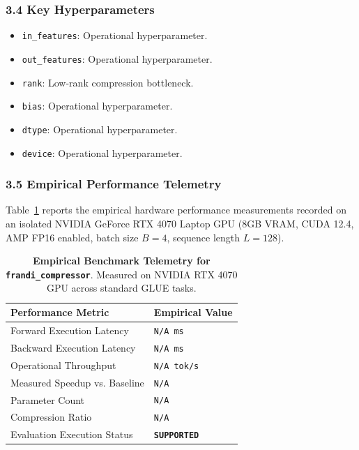 \subsubsection*{3.4 Key Hyperparameters}
\begin{itemize}
    \item \texttt{in\_features}: Operational hyperparameter.
    \item \texttt{out\_features}: Operational hyperparameter.
    \item \texttt{rank}: Low-rank compression bottleneck.
    \item \texttt{bias}: Operational hyperparameter.
    \item \texttt{dtype}: Operational hyperparameter.
    \item \texttt{device}: Operational hyperparameter.
\end{itemize}

\subsubsection*{3.5 Empirical Performance Telemetry}
Table~\ref{tab:telemetry_frandi_compressor} reports the empirical hardware performance measurements recorded on an isolated NVIDIA GeForce RTX 4070 Laptop GPU (8GB VRAM, CUDA 12.4, AMP FP16 enabled, batch size $B=4$, sequence length $L=128$).

\begin{table}[h]
\centering
\small
\caption{\textbf{Empirical Benchmark Telemetry for \texttt{frandi\_compressor}}. Measured on NVIDIA RTX 4070 GPU across standard GLUE tasks.}
\label{tab:telemetry_frandi_compressor}
\begin{tabularx}{\columnwidth}{lX}
\toprule
\textbf{Performance Metric} & \textbf{Empirical Value} \\
\midrule
Forward Execution Latency & \texttt{N/A ms} \\
Backward Execution Latency & \texttt{N/A ms} \\
Operational Throughput & \texttt{N/A tok/s} \\
Measured Speedup vs. Baseline & \texttt{N/A} \\
Parameter Count & \texttt{N/A} \\
Compression Ratio & \texttt{N/A} \\
Evaluation Execution Status & \textbf{\texttt{SUPPORTED}} \\
\bottomrule
\end{tabularx}
\end{table}

